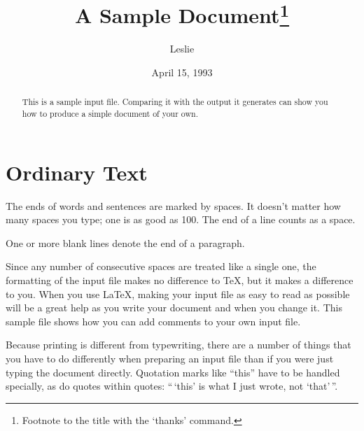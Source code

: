 \documentclass{kluwer}    %
\begin{document}
                                                                                   
\begin{article}
\begin{opening}         
\title{A Sample Document\thanks{Footnote 
            to the title with the `thanks' command.}} 
\author{Leslie }  
\date{April 15, 1993}

\begin{abstract}
This is a sample input file.  Comparing it with the output it
generates can show you how to produce a simple document of
your own.
\end{abstract}


\end{opening}           

\section{Ordinary Text}  

The ends  of words and sentences are marked 
  by   spaces. It  doesn't matter how many 
spaces    you type; one is as good as 100.  The
end of   a line counts as a space.

One   or more   blank lines denote the  end 
of  a paragraph.  

Since any number of consecutive spaces are treated like a single
one, the formatting of the input file makes no difference to
      \TeX,         %
but it makes a difference to you.  
When you use
      \LaTeX,       %
making your input file as easy to read as possible
will be a great help as you write your document and when you
change it.  This sample file shows how you can add comments to
your own input file.

Because printing is different from typewriting, there are a 
number of things that you have to do differently when preparing 
an input file than if you were just typing the document directly.  
Quotation marks like 
       ``this'' 
have to be handled specially, as do quotes within quotes: 
       ``\,`this'                  %
    is what I just 
    wrote, not  `that'\,''.  


\end{article}
\end{document}
